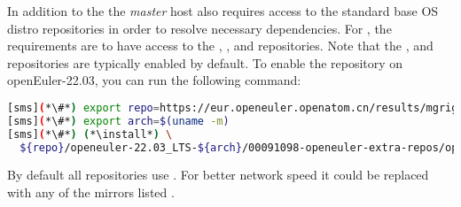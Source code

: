 In addition to the \OHPC{} 
\iftoggle{isxCAT}{and \xCAT{} package repositories,}{package repository,}
the {\em master} host also requires access to the standard base OS distro
repositories in order to resolve necessary dependencies. For \baseOS{}, the
requirements are to have access to the {\color{purple}{OS}},
{\color{purple}{Everything}}, {\color{purple}{EPOL main}} and
{\color{purple}{EPOL update}} repositories.  Note that the
{\color{purple}{OS}}, {\color{purple}{Everything}} and {\color{purple}{EPOL
main}} repositories are typically enabled by default.  To enable the 
{\color{purple}{EPOL update}} repository on openEuler-22.03, you can run the following
command:

\begin{lstlisting}[language=bash,keywords={},basicstyle=\fontencoding{T1}\fontsize{7.6}{10}\ttfamily]
[sms](*\#*) export repo=https://eur.openeuler.openatom.cn/results/mgrigorov/OpenHPC
[sms](*\#*) export arch=$(uname -m)
[sms](*\#*) (*\install*) \
  ${repo}/openeuler-22.03_LTS-${arch}/00091098-openeuler-extra-repos/openeuler-extra-repos-22.03-LTS.noarch.rpm
\end{lstlisting}


By default all repositories use {\color{blue}{http://repo.openeuler.org}}. 
For better network speed it could be replaced with any of the mirrors listed
\href{https://www.openeuler.org/en/mirror/list/}{\color{blue}{here}}.
